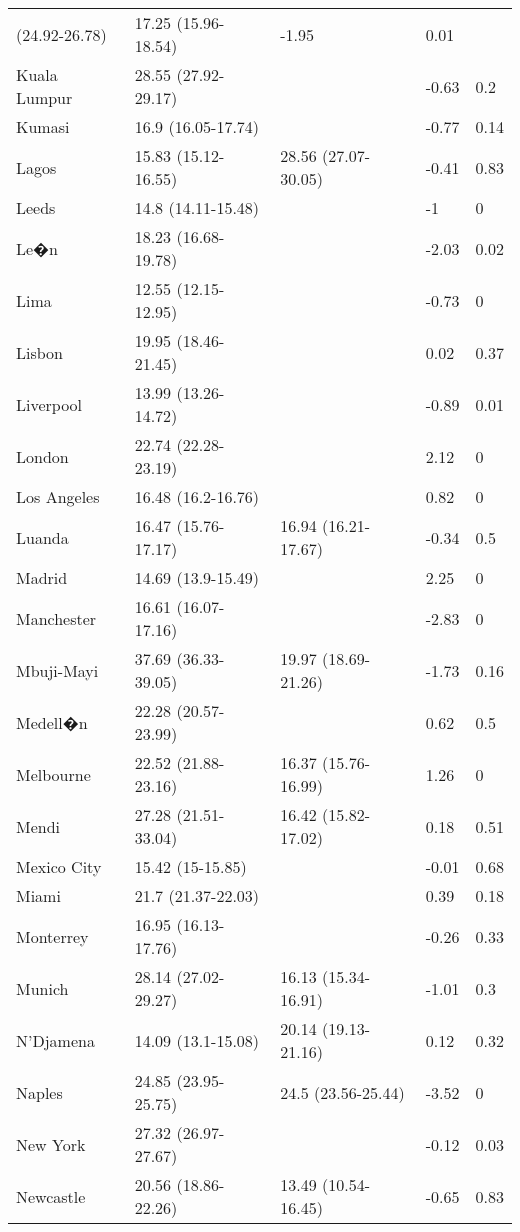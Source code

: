 \begin{longtable}{lllll}
 (24.92-26.78) & 17.25
 (15.96-18.54) & -1.95 & 0.01 \\ 
  Kuala Lumpur & 28.55
 (27.92-29.17) &  & -0.63 & 0.2 \\ 
  Kumasi & 16.9
 (16.05-17.74) &  & -0.77 & 0.14 \\ 
  Lagos & 15.83
 (15.12-16.55) & 28.56
 (27.07-30.05) & -0.41 & 0.83 \\ 
  Leeds & 14.8
 (14.11-15.48) &  & -1 & 0 \\ 
  Le�n & 18.23
 (16.68-19.78) &  & -2.03 & 0.02 \\ 
  Lima & 12.55
 (12.15-12.95) &  & -0.73 & 0 \\ 
  Lisbon & 19.95
 (18.46-21.45) &  & 0.02 & 0.37 \\ 
  Liverpool & 13.99
 (13.26-14.72) &  & -0.89 & 0.01 \\ 
  London & 22.74
 (22.28-23.19) &  & 2.12 & 0 \\ 
  Los Angeles & 16.48
 (16.2-16.76) &  & 0.82 & 0 \\ 
  Luanda & 16.47
 (15.76-17.17) & 16.94
 (16.21-17.67) & -0.34 & 0.5 \\ 
  Madrid & 14.69
 (13.9-15.49) &  & 2.25 & 0 \\ 
  Manchester & 16.61
 (16.07-17.16) &  & -2.83 & 0 \\ 
  Mbuji-Mayi & 37.69
 (36.33-39.05) & 19.97
 (18.69-21.26) & -1.73 & 0.16 \\ 
  Medell�n & 22.28
 (20.57-23.99) &  & 0.62 & 0.5 \\ 
  Melbourne & 22.52
 (21.88-23.16) & 16.37
 (15.76-16.99) & 1.26 & 0 \\ 
  Mendi & 27.28
 (21.51-33.04) & 16.42
 (15.82-17.02) & 0.18 & 0.51 \\ 
  Mexico City & 15.42
 (15-15.85) &  & -0.01 & 0.68 \\ 
  Miami & 21.7
 (21.37-22.03) &  & 0.39 & 0.18 \\ 
  Monterrey & 16.95
 (16.13-17.76) &  & -0.26 & 0.33 \\ 
  Munich & 28.14
 (27.02-29.27) & 16.13
 (15.34-16.91) & -1.01 & 0.3 \\ 
  N'Djamena & 14.09
 (13.1-15.08) & 20.14
 (19.13-21.16) & 0.12 & 0.32 \\ 
  Naples & 24.85
 (23.95-25.75) & 24.5
 (23.56-25.44) & -3.52 & 0 \\ 
  New York & 27.32
 (26.97-27.67) &  & -0.12 & 0.03 \\ 
  Newcastle & 20.56
 (18.86-22.26) & 13.49
 (10.54-16.45) & -0.65 & 0.83 \\ 

\end{longtable}
